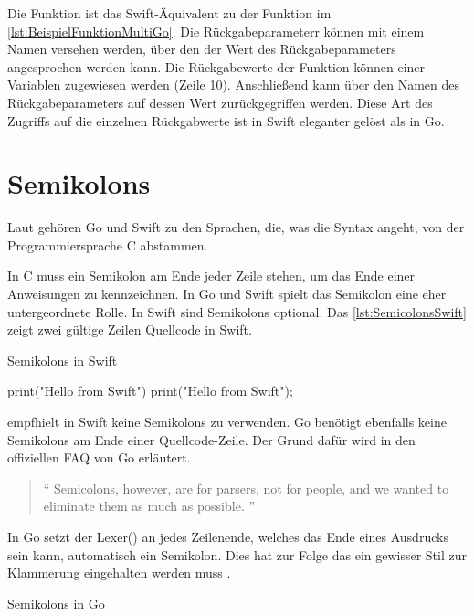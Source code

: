 Die Funktion ist das Swift-Äquivalent zu der Funktion im \autoref{lst:BeispielFunktionMultiGo}. 
Die Rückgabeparameterr können mit einem Namen versehen werden, über den der Wert des Rückgabeparameters angesprochen werden kann. 
Die Rückgabewerte der Funktion können einer Variablen zugewiesen werden (Zeile 10).
Anschließend kann über den Namen des Rückgabeparameters auf dessen Wert zurückgegriffen werden. 
Diese Art des Zugriffs auf die einzelnen Rückgabwerte ist in Swift eleganter gelöst als in Go.

\section{Semikolons}
\label{sec:Semikolons}
Laut \cite{Wikipedia.ListProgrammingLanguages} gehören Go und Swift zu den Sprachen, die, was die Syntax angeht, von der Programmiersprache C abstammen.

In C muss ein Semikolon am Ende jeder Zeile stehen, um das Ende einer Anweisungen zu kennzeichnen.
In Go und Swift spielt das Semikolon eine eher untergeordnete Rolle.
In Swift sind Semikolons optional. 
Das \autoref{lst:SemicolonsSwift} zeigt zwei gültige Zeilen Quellcode in Swift.

\begin{listing}
\caption{Semikolons in Swift \cite[S.15]{Hoffman.2017}}
\label{lst:SemicolonsSwift}
\begin{SwiftCode}
print("Hello from Swift")
print("Hello from Swift");
\end{SwiftCode}
\end{listing}

\cite{Hoffman.2017} empfhielt in Swift keine Semikolons zu verwenden. 
Go benötigt ebenfalls keine Semikolons am Ende einer Quellcode-Zeile. 
Der Grund dafür wird in den offiziellen FAQ von Go erläutert. 

\begin{quote}
\enquote{
Semicolons, however, are for parsers, not for people, and we wanted to eliminate them as much as possible.
}\cite{Golang.FAQ}
\end{quote}

In Go setzt der Lexer() an jedes Zeilenende, welches das Ende eines Ausdrucks sein kann, automatisch ein Semikolon. 
Dies hat zur Folge das ein gewisser Stil zur Klammerung eingehalten werden muss \cite{Golang.FAQ}.

\begin{listing}[H]
\caption{Semikolons in Go}
\label{lst:SemicolonGo}
\begin{GoCode}
package main

func add(a int, b int) (int){
    return a + b
}

func sub(a int, b int) (int)
{
    return a - b
}
//Compiler-Ausgabe: 
//main.go:8: syntax error: unexpected semicolon or newline before {
//Gofmt-Ausgabe:
//8:1: expected declaration, found '{'
\end{GoCode}
\end{listing}

